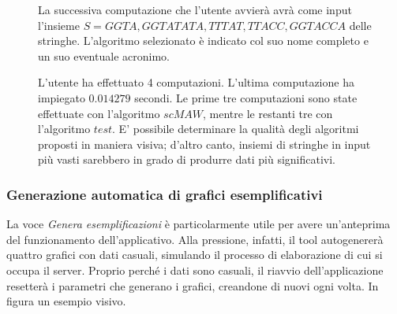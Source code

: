\begin{figure}[ht!]
    \centering
    \caption{La successiva computazione che l'utente avvierà avrà come input l'insieme $S={GGTA, GGTATATA, TTTAT, TTACC, GGTACCA}$ delle stringhe. L'algoritmo selezionato è indicato col suo nome completo e un suo eventuale acronimo.}
    \label{fig:esempio}
\end{figure}

\begin{figure}[ht!]
    \centering
    \caption{L'utente ha effettuato 4 computazioni. L'ultima computazione ha impiegato $0.014279$ secondi. Le prime tre computazioni sono state effettuate con l'algoritmo $scMAW$, mentre le restanti tre con l'algoritmo $test$. E' possibile determinare la qualità degli algoritmi proposti in maniera visiva; d'altro canto, insiemi di stringhe in input più vasti sarebbero in grado di produrre dati più significativi.}
    \label{fig:esempio}
\end{figure}

\newpage

\subsubsection{Generazione automatica di grafici esemplificativi}

La voce \textit{Genera esemplificazioni} è particolarmente utile per avere un'anteprima del funzionamento dell'applicativo. Alla pressione, infatti, il tool autogenererà quattro grafici con dati casuali, simulando il processo di elaborazione di cui si occupa il server. Proprio perché i dati sono casuali, il riavvio dell'applicazione resetterà i parametri che generano i grafici, creandone di nuovi ogni volta. In figura un esempio visivo.

